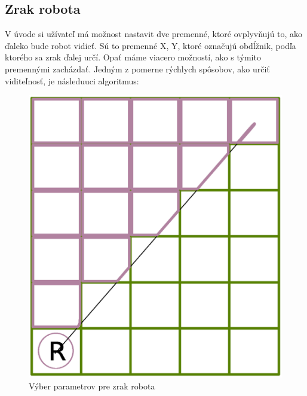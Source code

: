 \subsection{Zrak robota}
V úvode si užívateľ má možnost nastavit dve premenné, ktoré ovplyvňujú to, ako ďaleko bude robot vidieť. Sú to premenné X, Y, ktoré označujú obdĺžnik, podľa ktorého sa zrak ďalej určí. Opať máme viacero možností, ako s týmito premennými zacházdať. Jedným z pomerne rýchlych spôsobov, ako určiť viditeľnosť, je následuuci algoritmus:

\begin{figure}
\centering
\includegraphics[totalheight=0.2\textheight,width=.6\textwidth]{chooseVisible}
\caption {Výber parametrov pre zrak robota}
\label{choosing}
\end{figure}


